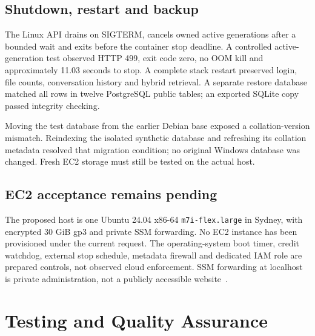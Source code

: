 \documentclass[11pt,a4paper,oneside]{report}
\begin{document}
\section{Shutdown, restart and backup}
The Linux API drains on SIGTERM, cancels owned active generations after a bounded wait and exits before the container stop deadline. A controlled active-generation test observed HTTP 499, exit code zero, no OOM kill and approximately 11.03 seconds to stop. A complete stack restart preserved login, file counts, conversation history and hybrid retrieval. A separate restore database matched all rows in twelve PostgreSQL public tables; an exported SQLite copy passed integrity checking.

Moving the test database from the earlier Debian base exposed a collation-version mismatch. Reindexing the isolated synthetic database and refreshing its collation metadata resolved that migration condition; no original Windows database was changed. Fresh EC2 storage must still be tested on the actual host.
\section{EC2 acceptance remains pending}
The proposed host is one Ubuntu 24.04 x86-64 \texttt{m7i-flex.large} in Sydney, with encrypted 30 GiB gp3 and private SSM forwarding. No EC2 instance has been provisioned under the current request. The operating-system boot timer, credit watchdog, external stop schedule, metadata firewall and dedicated IAM role are prepared controls, not observed cloud enforcement. SSM forwarding at localhost is private administration, not a publicly accessible website~\cite{ec2,ssmsession,docker}.
\FloatBarrier

\chapter{Testing and Quality Assurance}
\end{document}
